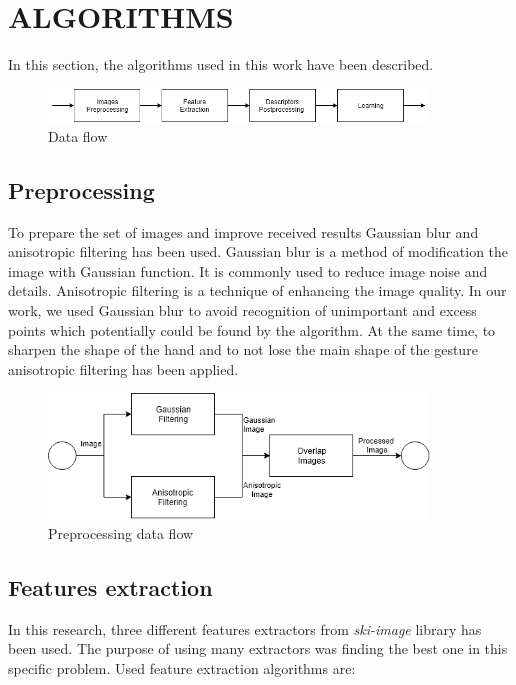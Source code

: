 \documentclass[11pt,a4paper]{article}
\begin{document}
\section{ALGORITHMS}

	In this section, the algorithms used in this work have been described.
	\begin{figure}[H]
		\centering
		\includegraphics[width=0.9\textwidth]{Algorithm.png}
		\caption{Data flow}
		\label{fig:Algorithm}
	\end{figure} 

\subsection{Preprocessing}
	
	To prepare the set of images and improve received results Gaussian blur and anisotropic filtering has been used. Gaussian blur is a method of modification the image with Gaussian function. It is commonly used to reduce image noise and details. Anisotropic filtering is a technique of enhancing the image quality. In our work, we used Gaussian blur to avoid recognition of unimportant and excess points which potentially could be found by the algorithm. At the same time, to sharpen the shape of the hand and to not lose the main shape of the gesture anisotropic filtering has been applied.
	
	
	\begin{figure}[H]
		\centering
		\includegraphics[width=0.9\textwidth]{Preprocessing.png}
		\caption{Preprocessing data flow}
		\label{fig:Preprocessing}
	\end{figure}

\subsection{Features extraction}

In this research, three different features extractors from \textit{ski-image} library has been used. The purpose of using many extractors was finding the best one in this specific problem. Used feature extraction algorithms are:
\end{document}
